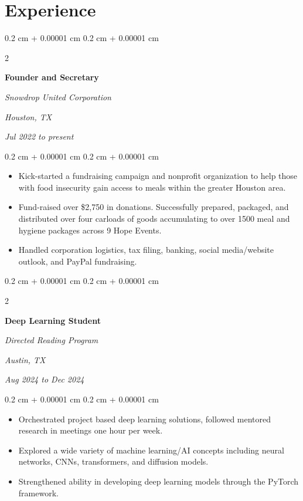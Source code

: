 \documentclass[10pt, letterpaper]{article}
\newenvironment{highlights}{
    \begin{itemize}[
        topsep=0.10 cm,
        parsep=0.10 cm,
        partopsep=0pt,
        itemsep=0pt,
        leftmargin=0.4 cm + 10pt
    ]
}{
    \end{itemize}
} %
\newenvironment{onecolentry}{
    \begin{adjustwidth}{
        0.2 cm + 0.00001 cm
    }{
        0.2 cm + 0.00001 cm
    }
}{
    \end{adjustwidth}
} %
\newenvironment{twocolentry}[2][]{
    \onecolentry
    \def\secondColumn{#2}
    \setcolumnwidth{\fill, 4.5 cm}
    \begin{paracol}{2}
}{
    \switchcolumn \raggedleft \secondColumn
    \end{paracol}
    \endonecolentry
} %
\begin{document}
    
    \section{Experience}



        
        \begin{twocolentry}{
        \textit{Houston, TX}    
            
        \textit{Jul 2022 to present}}
            \textbf{Founder and Secretary}
            
            \textit{Snowdrop United Corporation}
        \end{twocolentry}

        \vspace{0.10 cm}
        \begin{onecolentry}
            \begin{highlights}
                \item Kick-started a fundraising campaign and nonprofit organization to help those with food insecurity gain access to meals within the greater Houston area.
                \item Fund-raised over \$2,750 in donations. Successfully prepared, packaged, and distributed over four carloads of goods accumulating to over 1500 meal and hygiene packages across 9 Hope Events.
                \item Handled corporation logistics, tax filing, banking, social media/website outlook, and PayPal fundraising.
            \end{highlights}
        \end{onecolentry}


        \vspace{0.2 cm}

        \begin{twocolentry}{
        \textit{Austin, TX}    
            
        \textit{Aug 2024 to Dec 2024}}
            \textbf{Deep Learning Student}
            
            \textit{Directed Reading Program}
        \end{twocolentry}

        \vspace{0.10 cm}
        \begin{onecolentry}
            \begin{highlights}
                \item Orchestrated project based deep learning solutions, followed mentored research in meetings one hour per week.
                \item Explored a wide variety of machine learning/AI concepts including neural networks, CNNs, transformers, and diffusion models.
                \item Strengthened ability in developing deep learning models through the PyTorch framework.
            \end{highlights}
        \end{onecolentry}
\end{document}
